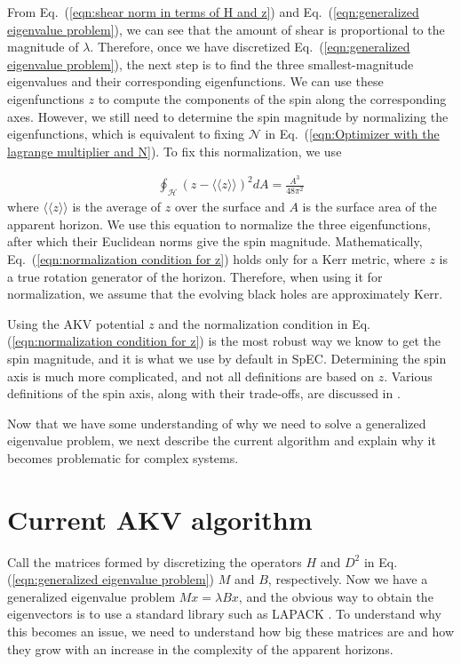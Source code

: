 \documentclass{iopjournal}
\begin{document}
From Eq.~(\ref{eqn:shear norm in terms of H and z}) and Eq.~(\ref{eqn:generalized eigenvalue problem}), we can see that the amount of shear is proportional to the magnitude of $\lambda$. Therefore, once we have discretized Eq.~(\ref{eqn:generalized eigenvalue problem}), the next step is to find the three smallest-magnitude eigenvalues and their corresponding eigenfunctions. We can use these eigenfunctions $z$ to compute the components of the spin along the corresponding axes. However, we still need to determine the spin magnitude by normalizing the eigenfunctions, which is equivalent to fixing $\mathcal{N}$ in Eq.~(\ref{eqn:Optimizer with the lagrange multiplier and N}). To fix this normalization, we use

\begin{align}
\oint_{\mathcal{H}}(z-\langle\langle z\rangle\rangle)^2 d A=\frac{A^3}{48 \pi^2}
\label{eqn:normalization condition for z}
\end{align}
where $\langle\langle z\rangle\rangle$ is the average of $z$ over the surface and $A$ is the surface area of the apparent horizon. We use this equation to normalize the three eigenfunctions, after which their Euclidean norms give the spin magnitude. Mathematically, Eq.~(\ref{eqn:normalization condition for z}) holds only for a Kerr metric, where $z$ is a true rotation generator of the horizon. Therefore, when using it for normalization, we assume that the evolving black holes are approximately Kerr.

Using the AKV potential $z$ and the normalization condition in Eq.(\ref{eqn:normalization condition for z}) is the most robust way we know to get the spin magnitude, and it is what we use by default in SpEC. Determining the spin axis is much more complicated, and not all definitions are based on $z$. Various definitions of the spin axis, along with their trade-offs, are discussed in \cite{Owen:2017yaj}.

Now that we have some understanding of why we need to solve a generalized eigenvalue problem, we next describe the current algorithm and explain why it becomes problematic for complex systems.

\section{\label{sec:Current AKV algorithm} Current AKV algorithm}

Call the matrices formed by discretizing the operators $H$ and $D^2$ in Eq.(\ref{eqn:generalized eigenvalue problem}) $M$ and $B$, respectively. Now we have a generalized eigenvalue problem $Mx = \lambda Bx$, and the obvious way to obtain the eigenvectors is to use a standard library such as LAPACK \cite{lapack_users_guide}. To understand why this becomes an issue, we need to understand how big these matrices are and how they grow with an increase in the complexity of the apparent horizons.
\end{document}
